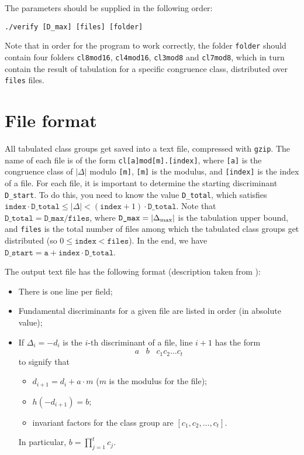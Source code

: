 \documentclass[a4paper,10pt]{article}
\newcommand{\code}{\lstinline}
\begin{document}
The parameters should be supplied in the following order:

\begin{lstlisting}
./verify [D_max] [files] [folder]
\end{lstlisting}

Note that in order for the program to work correctly, the folder \code{folder} should contain four folders \code{cl8mod16}, \code{cl4mod16}, \code{cl3mod8} and \code{cl7mod8}, which in turn contain the result of tabulation for a specific congruence class, distributed over \code{files} files.





\section{File format} \label{subsec:clgrp_format}

All tabulated class groups get saved into a text file, compressed with \code{gzip}. The name of each file is of the form \code{cl[a]mod[m].[index]}, where \code{[a]} is the congruence class of $|\Delta|$ modulo \code{[m]}, \code{[m]} is the modulus, and \code{[index]} is the index of a file. For each file, it is important to determine the starting discriminant \code{D_start}. To do this, you need to know the value \code{D_total}, which satisfies $\texttt{index} \cdot \texttt{D\_total} \leq |\Delta| < (\texttt{index} + 1) \cdot \texttt{D\_total}$. Note that $\texttt{D\_total} = \texttt{D\_max} / \texttt{files}$, where $\texttt{D\_max} = |\Delta_{\textnormal{max}}|$ is the tabulation upper bound, and \code{files} is the total number of files among which the tabulated class groups get distributed (so $0 \leq \texttt{index} < \texttt{files}$). In the end, we have $\texttt{D\_start} = \texttt{a} + \texttt{index} \cdot \texttt{D\_total}$.

The output text file has the following format (description taken from \cite{lmfdb}):

\begin{itemize}
\item There is one line per field;
\item Fundamental discriminants for a given file are listed in order (in absolute value);
\item If $\Delta_i = -d_i$ is the $i$-th discriminant of a file, line $i + 1$ has the form
%
$$
a \,\,\,\,\, b \,\,\,\,\, c_1c_2 \ldots c_t
$$
%
to signify that

\begin{itemize}
\item $d_{i+1} = d_i + a \cdot m$ ($m$ is the modulus for the file);
\item $h(-d_{i+1}) = b$;
\item invariant factors for the class group are $[c_1, c_2, \ldots, c_t]$.
\end{itemize}

In particular, $b = \prod_{j=1}^t c_j$.
\end{itemize}
\end{document}
